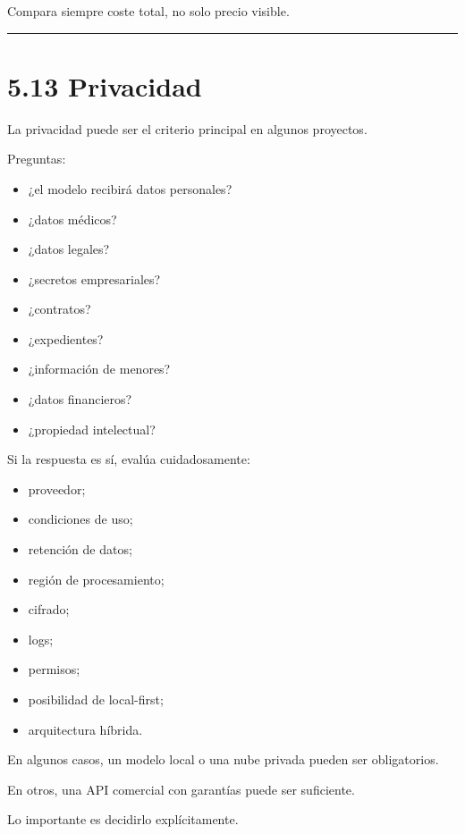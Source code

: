Compara siempre coste total, no solo precio visible.

\begin{center}\rule{0.5\linewidth}{0.5pt}\end{center}

\section{5.13 Privacidad}\label{privacidad-2}

La privacidad puede ser el criterio principal en algunos proyectos.

Preguntas:

\begin{itemize}
\tightlist
\item
  ¿el modelo recibirá datos personales?
\item
  ¿datos médicos?
\item
  ¿datos legales?
\item
  ¿secretos empresariales?
\item
  ¿contratos?
\item
  ¿expedientes?
\item
  ¿información de menores?
\item
  ¿datos financieros?
\item
  ¿propiedad intelectual?
\end{itemize}

Si la respuesta es sí, evalúa cuidadosamente:

\begin{itemize}
\tightlist
\item
  proveedor;
\item
  condiciones de uso;
\item
  retención de datos;
\item
  región de procesamiento;
\item
  cifrado;
\item
  logs;
\item
  permisos;
\item
  posibilidad de local-first;
\item
  arquitectura híbrida.
\end{itemize}

En algunos casos, un modelo local o una nube privada pueden ser
obligatorios.

En otros, una API comercial con garantías puede ser suficiente.

Lo importante es decidirlo explícitamente.

